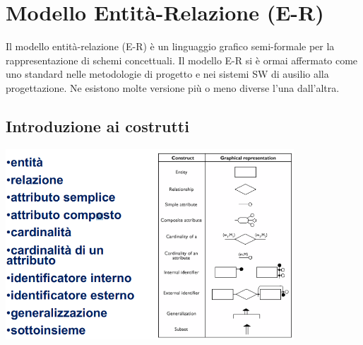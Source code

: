 \documentclass[12pt]{article}
\begin{document}
\section{Modello Entità-Relazione (E-R)}
Il modello entità-relazione (E-R) è un linguaggio grafico semi-formale per la rappresentazione di schemi concettuali.
Il modello E-R si è ormai affermato come uno standard nelle metodologie di progetto e nei sistemi SW di ausilio alla progettazione.
Ne esistono molte versione più o meno diverse l'una dall'altra.
\subsection{Introduzione ai costrutti}
\begin{center}
    \includegraphics[width = 0.81\textwidth]{Images/15.PNG}
\end{center}
\end{document}
